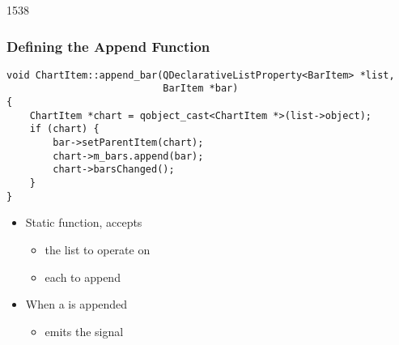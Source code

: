 \begin{slide}[fragile]{1538}\frametitle{Defining the Append Function}

\begin{lstlisting}
void ChartItem::append_bar(QDeclarativeListProperty<BarItem> *list,
                           BarItem *bar)
{
    ChartItem *chart = qobject_cast<ChartItem *>(list->object);
    if (chart) {
        bar->setParentItem(chart);
        chart->m_bars.append(bar);
        chart->barsChanged();
    }
}
\end{lstlisting}

\vspace*{0.5em}
\begin{itemize}
\item Static function, accepts
  \begin{itemize}
  \item the list to operate on
  \item each  to append
  \end{itemize}
\vspace*{0.5em}
\item When a  is appended
  \begin{itemize}
  \item emits the  signal
  \end{itemize}
\end{itemize}

\end{slide}

